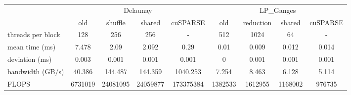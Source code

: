 \documentclass[conference]{IEEEtran}
\begin{document}
\begin{table}[ht!]
    \centering
    \begin{subtable}{\columnwidth}
        \centering
        \begin{adjustbox}{width=\columnwidth}
            \begin{tabular}{l|cccc|cccc}
                \toprule
                & \multicolumn{4}{c}{Delaunay} & \multicolumn{4}{c}{LP\_Ganges} \\
                \cmidrule(lr){2-5} \cmidrule(lr){6-9}
                & old & shuffle & shared & cuSPARSE & old & reduction & shared & cuSPARSE \\
                \midrule
                threads per block & 128 & 256 & 256 & - & 512 & 1024 & 64 & - \\
                mean time (ms) & 7.478 & 2.09 & 2.092 & 0.29 & 0.01 & 0.009 & 0.012 & 0.014 \\
                deviation (ms) & 0.003 & 0.001 & 0.001 & 0.001 & 0 & 0.001 & 0.001 & 0.001 \\
                bandwidth (GB/s) & 40.386 & 144.487 & 144.359 & 1040.253 & 7.254 & 8.463 & 6.128 & 5.114 \\
                FLOPS & 6731019 & 24081095 & 24059877 & 173375384 & 1382533 & 1612955 & 1168002 & 976735 \\
                \bottomrule
            \end{tabular}
        \end{adjustbox}
    \end{subtable}

    \vspace{1em} %


\end{table}
\end{document}
